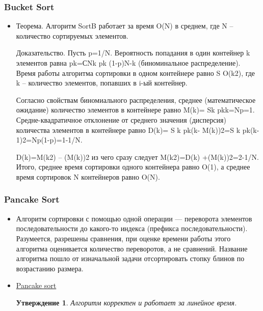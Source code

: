 \documentclass[t]{beamer}  %
\newtheorem{rstate}{Утверждение}
\begin{document}
\begin{frame}[t]
	\frametitle{Bucket Sort}%
	\begin{itemize}
		\item Теорема. Алгоритм SortB работает за время O(N) в среднем, где N – количество сортируемых элементов.
		
		Доказательство. Пусть p=1/N. Вероятность попадания в один контейнер k элементов равна pk=СNk pk (1-p)N-k  (биноминальное распределение).  Время работы алгоритма сортировки в одном контейнере равно S O(k2), где k – количество элементов, попавших в i-ый контейнер.
		
		Согласно свойствам биномиального распределения, среднее (математическое ожидание) количество элементов в контейнере равно M(k)= Sk  pkk=Np=1.  Средне-квадратичное отклонение от среднего значения (дисперсия) количества элементов в контейнере равно D(k)= S k  pk(k- M(k))2=S  k pk(k-1)2=Np(1-p)=1-1/N.
		
		D(k)=M(k2) – (M(k))2  из чего сразу следует M(k2)=D(k) +(M(k))2=2-1/N. Итого, среднее время сортировки одного контейнера равно O(1), а среднее время сортировок N контейнеров равно O(N).
	\end{itemize}
\end{frame}


\begin{frame}[t]
	\frametitle{Pancake Sort}
	\begin{itemize}
		\item Алгоритм сортировки с помощью одной операции — переворота элементов последовательности до какого-то индекса (префикса последовательности). Разумеется, разрешены сравнения, при оценке времени работы этого алгоритма оценивается количество переворотов, а не сравнений. Название алгоритма пошло от изначальной задачи отсортировать стопку блинов по возрастанию размера.
		\item \href{images/gif4.gif}{Pancake sort}
				\begin{rstate}
			Алгоритм корректен и работает за линейное время.    
		\end{rstate}
	\end{itemize}
\end{frame}
\end{document}
